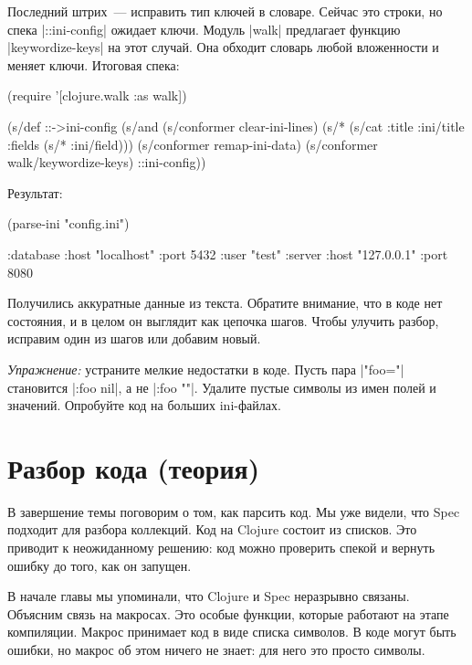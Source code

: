 Последний штрих~--- исправить тип ключей в словаре. Сейчас это строки, но спека
\spverb|::ini-config| ожидает ключи. Модуль \spverb|walk| предлагает функцию
\spverb|keywordize-keys| на этот случай. Она обходит словарь любой вложенности и
меняет ключи. Итоговая спека:

\begin{english}
  \begin{clojure}
(require '[clojure.walk :as walk])

(s/def ::->ini-config
  (s/and
   (s/conformer clear-ini-lines)
   (s/* (s/cat :title :ini/title :fields (s/* :ini/field)))
   (s/conformer remap-ini-data)
   (s/conformer walk/keywordize-keys)
   ::ini-config))
  \end{clojure}
\end{english}

\noindent
Результат:

\begin{english}
  \begin{clojure}
(parse-ini "config.ini")

{:database {:host "localhost"
            :port 5432
            :user "test"}
 :server {:host "127.0.0.1"
          :port 8080}}
  \end{clojure}
\end{english}

Получились аккуратные данные из текста. Обратите внимание, что в коде нет
состояния, и в целом он выглядит как цепочка шагов. Чтобы улучить разбор,
исправим один из шагов или добавим новый.

\emph{Упражнение:} устраните мелкие недостатки в коде. Пусть пара
\spverb|"foo="| становится \spverb|{:foo nil}|, а не \spverb|{:foo ""}|.
Удалите пустые символы из имен полей и значений. Опробуйте код на больших
ini-файлах.

\section{Разбор кода (теория)}

В завершение темы поговорим о том, как парсить код. Мы уже видели, что Spec
подходит для разбора коллекций. Код на Clojure состоит из списков. Это приводит
к неожиданному решению: код можно проверить спекой и вернуть ошибку до того, как
он запущен.

В начале главы мы упоминали, что Clojure и Spec неразрывно связаны. Объясним
связь на макросах. Это особые функции, которые работают на этапе
компиляции. Макрос принимает код в виде списка символов. В коде могут быть
ошибки, но макрос об этом ничего не знает: для него это просто символы.

